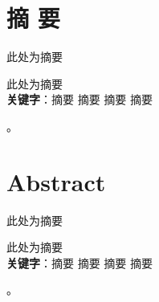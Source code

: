 \documentclass[a4paper,12pt]{report}
\begin{document}

\chapter *{ 摘 {\quad} 要}
\setcounter{page}{1}
\begin{spacing}{1.5}
{
	此处为摘要
	
	此处为摘要\\[0.5cm]
	
	\textbf{ \heiti 关键字}：\quad 摘要 \quad 摘要 \quad 摘要 \quad 摘要
}。
\end{spacing}


\chapter *{ Abstract }
\begin{spacing}{1.5}
	{
		此处为摘要
		
		此处为摘要\\[0.5cm]
		
		\textbf{ \heiti 关键字}：\quad 摘要 \quad 摘要 \quad 摘要 \quad 摘要
	}。
\end{spacing}

\tableofcontents %


\end{document}
